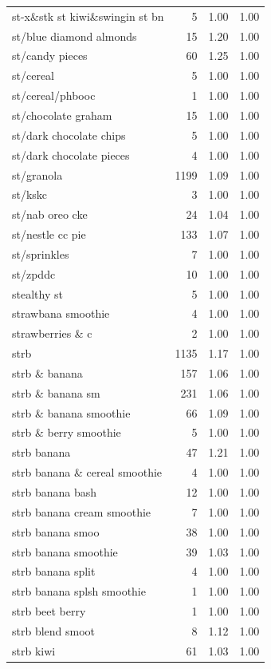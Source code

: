 \begin{table}
\begin{tabular}{lrrr}
st-x\&stk st kiwi\&swingin st bn & 5 & 1.00 & 1.00 \\
st/blue diamond almonds & 15 & 1.20 & 1.00 \\
st/candy pieces & 60 & 1.25 & 1.00 \\
st/cereal & 5 & 1.00 & 1.00 \\
st/cereal/phbooc & 1 & 1.00 & 1.00 \\
st/chocolate graham & 15 & 1.00 & 1.00 \\
st/dark chocolate chips & 5 & 1.00 & 1.00 \\
st/dark chocolate pieces & 4 & 1.00 & 1.00 \\
st/granola & 1199 & 1.09 & 1.00 \\
st/kskc & 3 & 1.00 & 1.00 \\
st/nab oreo cke & 24 & 1.04 & 1.00 \\
st/nestle cc pie & 133 & 1.07 & 1.00 \\
st/sprinkles & 7 & 1.00 & 1.00 \\
st/zpddc & 10 & 1.00 & 1.00 \\
stealthy st & 5 & 1.00 & 1.00 \\
strawbana smoothie & 4 & 1.00 & 1.00 \\
strawberries \& c & 2 & 1.00 & 1.00 \\
strb & 1135 & 1.17 & 1.00 \\
strb \& banana & 157 & 1.06 & 1.00 \\
strb \& banana sm & 231 & 1.06 & 1.00 \\
strb \& banana smoothie & 66 & 1.09 & 1.00 \\
strb \& berry smoothie & 5 & 1.00 & 1.00 \\
strb banana & 47 & 1.21 & 1.00 \\
strb banana \& cereal smoothie & 4 & 1.00 & 1.00 \\
strb banana bash & 12 & 1.00 & 1.00 \\
strb banana cream smoothie & 7 & 1.00 & 1.00 \\
strb banana smoo & 38 & 1.00 & 1.00 \\
strb banana smoothie & 39 & 1.03 & 1.00 \\
strb banana split & 4 & 1.00 & 1.00 \\
strb banana splsh smoothie & 1 & 1.00 & 1.00 \\
strb beet berry & 1 & 1.00 & 1.00 \\
strb blend smoot & 8 & 1.12 & 1.00 \\
strb kiwi & 61 & 1.03 & 1.00 \\

\end{tabular}
\end{table}

